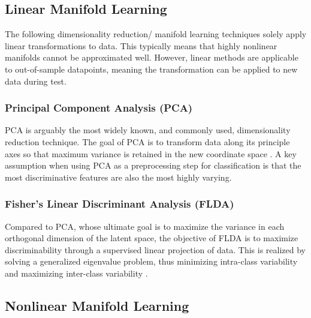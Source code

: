 \documentclass[conference]{IEEEtran}
\begin{document}
	\subsection{Linear Manifold Learning}
	The following dimensionality reduction/ manifold learning techniques solely apply linear transformations to data.  This typically means that highly nonlinear manifolds cannot be approximated well.  However, linear methods are applicable to out-of-sample datapoints, meaning the transformation can be applied to new data during test.
	\subsubsection*{Principal Component Analysis (PCA)}  PCA is arguably the most widely known, and commonly used, dimensionality reduction technique.  The goal of PCA is to transform data along its principle axes so that maximum variance is retained in the new coordinate space \cite{Tipping1999PPCA,Murphy2012Textbook}.  A key assumption when using PCA as a preprocessing step for classification is that the most discriminative features are also the most highly varying.
	\subsubsection*{Fisher's Linear Discriminant Analysis (FLDA)}  Compared to PCA, whose ultimate goal is to maximize the variance in each orthogonal dimension of the latent space, the objective of FLDA is to maximize discriminability through a supervised linear projection of data.  This is realized by solving a generalized eigenvalue problem, thus minimizing intra-class variability and maximizing inter-class variability \cite{Murphy2012Textbook,Sugiyama2006FDASupDimRed}.
	
	
	\subsection{Nonlinear Manifold Learning}
\end{document}
